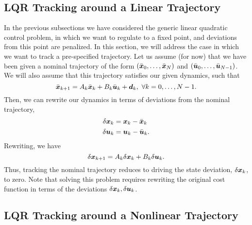 \subsection{LQR Tracking around a Linear Trajectory}

In the previous subsections we have considered the generic linear quadratic control problem, in which we want to regulate to a fixed point, and deviations from this point are penalized. In this section, we will address the case in which we want to track a pre-specified trajectory. Let us assume (for now) that we have been given a nominal trajectory of the form $(\bar{\bm{x}}_0, \ldots, \bar{\bm{x}}_{N})$ and $(\bar{\bm{u}}_0, \ldots, \bar{\bm{u}}_{N-1})$. We will also assume that this trajectory satisfies our given dynamics, such that 
\begin{equation}
\bar{\bm{x}}_{k+1} = A_k \bar{\bm{x}}_k + B_k \bar{\bm{u}}_k + \bm{d}_k,\,\, \forall k = 0, \ldots, N-1.    
\end{equation}
Then, we can rewrite our dynamics in terms of deviations from the nominal trajectory, 
\begin{align}
    \delta \bm{x}_k &= \bm{x}_k - \bar{\bm{x}}_k\\
    \delta \bm{u}_k &= \bm{u}_k - \bar{\bm{u}}_k.
\end{align}
Rewriting, we have 
\begin{equation}
    \delta \bm{x}_{k+1} = A_k \delta \bm{x}_k + B_k \delta \bm{u}_k.
\end{equation}
Thus, tracking the nominal trajectory reduces to driving the state deviation, $\delta \bm{x}_k$, to zero. Note that solving this problem requires rewriting the original cost function in terms of the deviations $\delta \bm{x}_k, \delta \bm{u}_k$. 


\subsection{LQR Tracking around a Nonlinear Trajectory}

